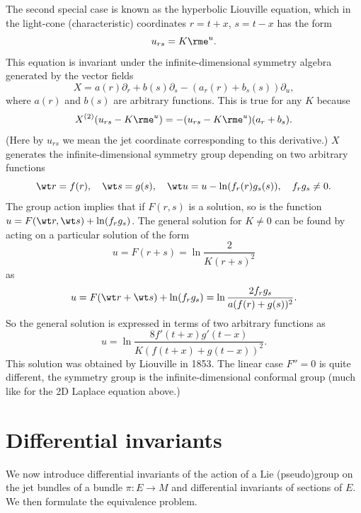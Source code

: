 \begin{example}
    The second special case is known as the hyperbolic Liouville equation, which in the light-cone (characteristic) coordinates $r=t+x$, $s=t-x$ has the form 
    \[u_{rs}=K\rme^u.\]
    This equation is invariant under the infinite-dimensional symmetry algebra generated by the vector fields 
    \[X=a(r)\partial_r+b(s)\partial_s-(a_r(r)+b_s(s))\partial_u,\]
    where $a(r)$ and $b(s)$ are arbitrary functions. This is true for any $K$ because 
    \[X^{(2)}(u_{rs}-K\rme^u)=-(u_{rs}-K\rme^u)(a_r+b_s).\]
    (Here by $u_{rs}$ we mean the jet coordinate corresponding to this derivative.) $X$ generates the infinite-dimensional symmetry group depending on two arbitrary functions 
    \[\wt r=f(r),\quad \wt s=g(s),\quad \wt u=u-\ln(f_r(r)g_s(s)),\quad f_rg_s\neq 0.\]
    The group action implies that if $F(r,s)$ is a solution, so is the function $u=F(\wt r,\wt s)+\ln(f_rg_s)$. The general solution for $K\neq 0$ can be found by acting on a particular solution of the form 
    \[u=F(r+s)=\ln\frac{2}{K(r+s)^2}\]
    as 
    \[u=F(\wt r+\wt s)+\ln (f_rg_s)=\ln\frac{2f_rg_s}{a(f(r)+g(s))^2}.\]
    So the general solution is expressed in terms of two arbitrary functions as
    \[u=\ln\frac{8 f'(t+x)g'(t-x)}{K(f(t+x)+g(t-x))^2}.\]
    This solution was obtained by Liouville in 1853. The linear case $F''=0$ is quite different, the symmetry group is the infinite-dimensional conformal group (much like for the 2D Laplace equation above.)
\end{example}






\section{Differential invariants}

We now introduce differential invariants of the action of a Lie (pseudo)group on the jet bundles of a bundle $\pi:E\to M$ and differential invariants of sections of $E$. We then formulate the equivalence problem. 


